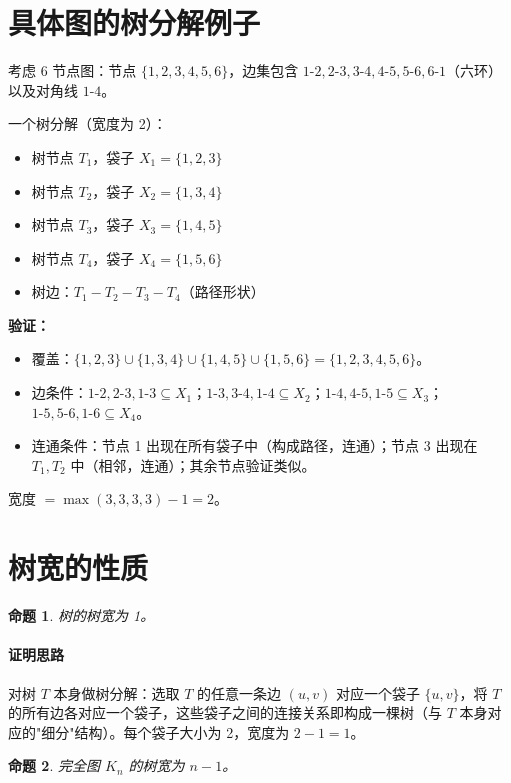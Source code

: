 \documentclass[UTF8,openany,12pt]{ctexbook}
\newtheorem{proposition}{命题}[chapter]
\theoremstyle{remark}
\newcommand{\proofidea}[1]{\paragraph{证明思路}#1}
\begin{document}
\section{具体图的树分解例子}

考虑 6 节点图：节点 $\{1,2,3,4,5,6\}$，边集包含 $1\text{-}2, 2\text{-}3, 3\text{-}4, 4\text{-}5, 5\text{-}6, 6\text{-}1$（六环）以及对角线 $1\text{-}4$。

一个树分解（宽度为 2）：

\begin{itemize}
  \item 树节点 $T_1$，袋子 $X_1 = \{1, 2, 3\}$
  \item 树节点 $T_2$，袋子 $X_2 = \{1, 3, 4\}$
  \item 树节点 $T_3$，袋子 $X_3 = \{1, 4, 5\}$
  \item 树节点 $T_4$，袋子 $X_4 = \{1, 5, 6\}$
  \item 树边：$T_1 - T_2 - T_3 - T_4$（路径形状）
\end{itemize}

\textbf{验证：}
\begin{itemize}
  \item 覆盖：$\{1,2,3\}\cup\{1,3,4\}\cup\{1,4,5\}\cup\{1,5,6\} = \{1,2,3,4,5,6\}$。\checkmark
  \item 边条件：$1\text{-}2,2\text{-}3,1\text{-}3 \subseteq X_1$；$1\text{-}3,3\text{-}4,1\text{-}4 \subseteq X_2$；$1\text{-}4,4\text{-}5,1\text{-}5 \subseteq X_3$；$1\text{-}5,5\text{-}6,1\text{-}6 \subseteq X_4$。\checkmark
  \item 连通条件：节点 1 出现在所有袋子中（构成路径，连通）；节点 3 出现在 $T_1,T_2$ 中（相邻，连通）；其余节点验证类似。\checkmark
\end{itemize}

宽度 $= \max(3,3,3,3)-1 = 2$。

\section{树宽的性质}

\begin{proposition}
树的树宽为 1。
\end{proposition}

\proofidea{对树 $T$ 本身做树分解：选取 $T$ 的任意一条边 $(u,v)$ 对应一个袋子 $\{u,v\}$，将 $T$ 的所有边各对应一个袋子，这些袋子之间的连接关系即构成一棵树（与 $T$ 本身对应的"细分"结构）。每个袋子大小为 2，宽度为 $2-1=1$。}

\begin{proposition}
完全图 $K_n$ 的树宽为 $n-1$。
\end{proposition}
\end{document}
